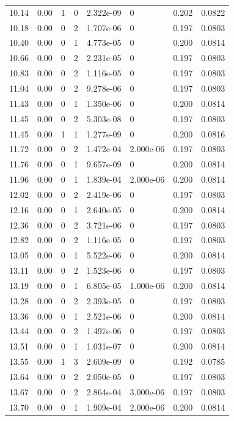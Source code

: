 \documentclass[preview]{standalone}
\begin{document}
{{{\begin{tabular}{L{1.2cm}C{1.2cm} C{0.3cm}C{0.5cm} C{1.4cm}C{1.4cm} C{1.4cm}C{1.4cm}}
  10.14  &  0.00  & 1     &  0 &  2.322e-09  & 0  & 0.202 &  0.0822   \\ 
  10.18  &  0.00  & 0     &  2 &  1.707e-06  & 0  & 0.197 &  0.0803   \\ 
  10.40  &  0.00  & 0     &  1 &  4.773e-05  & 0  & 0.200 &  0.0814   \\ 
  10.66  &  0.00  & 0     &  2 &  2.231e-05  & 0  & 0.197 &  0.0803   \\ 
  10.83  &  0.00  & 0     &  2 &  1.116e-05  & 0  & 0.197 &  0.0803   \\ 
  11.04  &  0.00  & 0     &  2 &  9.278e-06  & 0  & 0.197 &  0.0803   \\ 
  11.43  &  0.00  & 0     &  1 &  1.350e-06  & 0  & 0.200 &  0.0814   \\ 
  11.45  &  0.00  & 0     &  2 &  5.303e-08  & 0  & 0.197 &  0.0803   \\ 
  11.45  &  0.00  & 1     &  1 &  1.277e-09  & 0  & 0.200 &  0.0816   \\ 
  11.72  &  0.00  & 0     &  2 &  1.472e-04  & 2.000e-06  & 0.197 &  0.0803   \\ 
  11.76  &  0.00  & 0     &  1 &  9.657e-09  & 0  & 0.200 &  0.0814   \\ 
  11.96  &  0.00  & 0     &  1 &  1.839e-04  & 2.000e-06  & 0.200 &  0.0814   \\ 
  12.02  &  0.00  & 0     &  2 &  2.419e-06  & 0  & 0.197 &  0.0803   \\ 
  12.16  &  0.00  & 0     &  1 &  2.640e-05  & 0  & 0.200 &  0.0814   \\ 
  12.36  &  0.00  & 0     &  2 &  3.721e-06  & 0  & 0.197 &  0.0803   \\ 
  12.82  &  0.00  & 0     &  2 &  1.116e-05  & 0  & 0.197 &  0.0803   \\ 
  13.05  &  0.00  & 0     &  1 &  5.522e-06  & 0  & 0.200 &  0.0814   \\ 
  13.11  &  0.00  & 0     &  2 &  1.523e-06  & 0  & 0.197 &  0.0803   \\ 
  13.19  &  0.00  & 0     &  1 &  6.805e-05  & 1.000e-06  & 0.200 &  0.0814   \\ 
  13.28  &  0.00  & 0     &  2 &  2.393e-05  & 0  & 0.197 &  0.0803   \\ 
  13.36  &  0.00  & 0     &  1 &  2.521e-06  & 0  & 0.200 &  0.0814   \\ 
  13.44  &  0.00  & 0     &  2 &  1.497e-06  & 0  & 0.197 &  0.0803   \\ 
  13.51  &  0.00  & 0     &  1 &  1.031e-07  & 0  & 0.200 &  0.0814   \\ 
  13.55  &  0.00  & 1     &  3 &  2.609e-09  & 0  & 0.192 &  0.0785   \\ 
  13.64  &  0.00  & 0     &  2 &  2.050e-05  & 0  & 0.197 &  0.0803   \\ 
  13.67  &  0.00  & 0     &  2 &  2.864e-04  & 3.000e-06  & 0.197 &  0.0803   \\ 
  13.70  &  0.00  & 0     &  1 &  1.909e-04  & 2.000e-06  & 0.200 &  0.0814   \\ 
\hline 
\end{tabular} 

}}}
\end{document}
